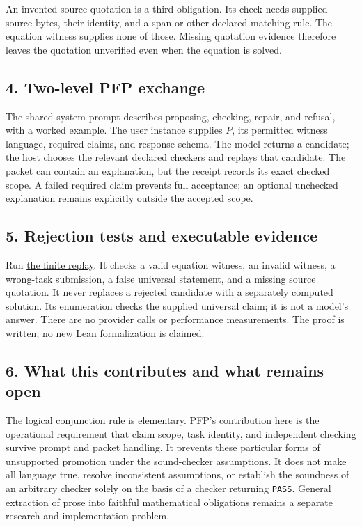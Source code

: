 \documentclass[
  11pt,
]{article}
\newcommand{\passthrough}[1]{#1}
\begin{document}
An invented source quotation is a third obligation. Its check needs
supplied source bytes, their identity, and a span or other declared
matching rule. The equation witness supplies none of those. Missing
quotation evidence therefore leaves the quotation unverified even when
the equation is solved.

\subsection{4. Two-level PFP exchange}\label{two-level-pfp-exchange}

The shared system prompt describes proposing, checking, repair, and
refusal, with a worked example. The user instance supplies \(P\), its
permitted witness language, required claims, and response schema. The
model returns a candidate; the host chooses the relevant declared
checkers and replays that candidate. The packet can contain an
explanation, but the receipt records its exact checked scope. A failed
required claim prevents full acceptance; an optional unchecked
explanation remains explicitly outside the accepted scope.

\subsection{5. Rejection tests and executable
evidence}\label{rejection-tests-and-executable-evidence}

Run
\href{https://github.com/dbccpage/the_symbol_game/blob/main/atlas/coda_atlas/F004_papers/015_pfp/023_pfp_task_bound_claims_and_hallucination_control/code/replay.py}{the
finite replay}. It checks a valid equation witness, an invalid witness,
a wrong-task submission, a false universal statement, and a missing
source quotation. It never replaces a rejected candidate with a
separately computed solution. Its enumeration checks the supplied
universal claim; it is not a model's answer. There are no provider calls
or performance measurements. The proof is written; no new Lean
formalization is claimed.

\subsection{6. What this contributes and what remains
open}\label{what-this-contributes-and-what-remains-open}

The logical conjunction rule is elementary. PFP's contribution here is
the operational requirement that claim scope, task identity, and
independent checking survive prompt and packet handling. It prevents
these particular forms of unsupported promotion under the sound-checker
assumptions. It does not make all language true, resolve inconsistent
assumptions, or establish the soundness of an arbitrary checker solely
on the basis of a checker returning \passthrough{\lstinline!PASS!}.
General extraction of prose into faithful mathematical obligations
remains a separate research and implementation problem.
\end{document}
